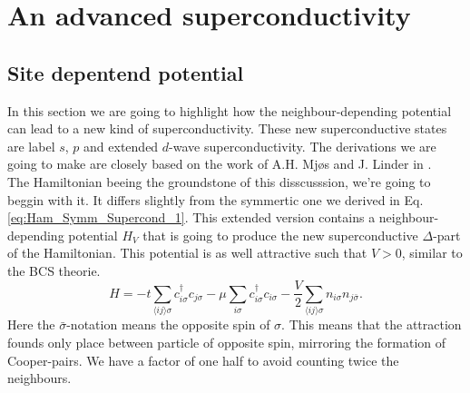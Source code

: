 \documentclass[../main.tex]{subfile}
\begin{document}
\section{An advanced superconductivity}
\subsection{Site depentend potential}
In this section we are going to highlight how the neighbour-depending potential can lead to a new kind of superconductivity.
These new superconductive states are label $s$, $p$ and extended $d$-wave superconductivity. The derivations we are going to make are closely based on
the work of A.H. Mjøs and J. Linder in \cite{Mjos2019}.\\

The Hamiltonian beeing the groundstone of this 
disscusssion, we're going to beggin with it. It differs slightly from the symmertic one we derived in Eq.\ref{eq:Ham_Symm_Supercond_1}. This extended version contains a neighbour-depending potential $H_V$ that is going to 
produce the new superconductive $\Delta$-part of the Hamiltonian. This potential is as well attractive such that $V>0$, similar to the BCS theorie.
\begin{equation}
    H = -t\sum_{\langle ij\rangle \sigma} c_{i\sigma}^{\dagger}c_{j\sigma} - \mu \sum_{i\sigma} c_{i\sigma}^{\dagger}c_{i\sigma} - \frac{V}{2} \sum_{\langle ij\rangle \sigma} n_{i\sigma}n_{j\bar{\sigma}}.
\end{equation}
Here the $\bar{\sigma}$-notation means the opposite spin of $\sigma$. This means that the attraction founds only place between particle of opposite spin, mirroring the formation of Cooper-pairs.
We have a factor of one half to avoid counting twice the neighbours.\\
\end{document}
